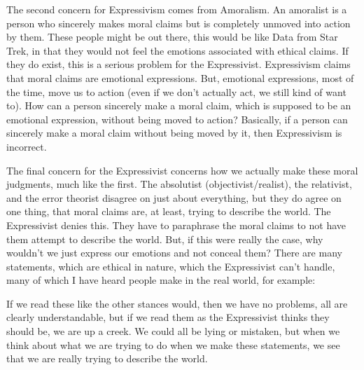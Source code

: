The second concern for Expressivism comes from Amoralism. An amoralist is a person who sincerely makes moral claims but is completely unmoved into action by them. These people might be out there, this would be like Data from Star Trek, in that they would not feel the emotions associated with ethical claims. If they do exist, this is a serious problem for the Expressivist. Expressivism claims that moral claims are emotional expressions. But, emotional expressions, most of the time, move us to action (even if we don’t actually act, we still kind of want to). How can a person sincerely make a moral claim, which is supposed to be an emotional expression, without being moved to action?  Basically, if a person can sincerely make a moral claim without being moved by it, then Expressivism is incorrect. 

The final concern for the Expressivist concerns how we actually make these moral judgments, much like the first. The absolutist (objectivist/realist), the relativist, and the error theorist disagree on just about everything, but they do agree on one thing, that moral claims are, at least, trying to describe the world. The Expressivist denies this. They have to paraphrase the moral claims to not have them attempt to describe the world. But, if this were really the case, why wouldn’t we just express our emotions and not conceal them? There are many statements, which are ethical in nature, which the Expressivist can't handle, many of which I have heard people make in the real world, for example:

If we read these like the other stances would, then we have no problems, all are clearly understandable, but if we read them as the Expressivist thinks they should be, we are up a creek. We could all be lying or mistaken, but when we think about what we are trying to do when we make these statements, we see that we are really trying to describe the world. 